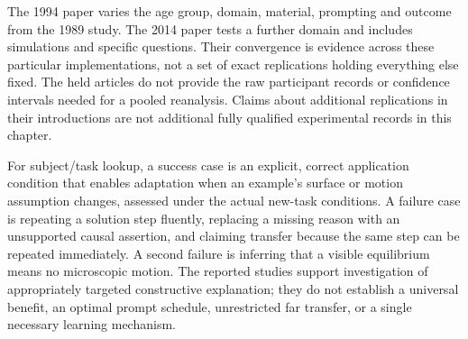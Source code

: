 The 1994 paper varies the age group, domain, material, prompting and outcome
from the 1989 study. The 2014 paper tests a further domain and includes
simulations and specific questions. Their convergence is evidence across
these particular implementations, not a set of exact replications holding
everything else fixed. The held articles do not provide the raw participant
records or confidence intervals needed for a pooled reanalysis. Claims
about additional replications in their introductions are not additional
fully qualified experimental records in this chapter.

For subject/task lookup, a success case is an explicit, correct application
condition that enables adaptation when an example's surface or motion
assumption changes, assessed under the actual new-task conditions. A failure
case is repeating a solution step fluently, replacing a missing reason with
an unsupported causal assertion, and claiming transfer because the same
step can be repeated immediately. A second failure is inferring that a
visible equilibrium means no microscopic motion. The reported studies
support investigation of appropriately targeted constructive explanation;
they do not establish a universal benefit, an optimal prompt schedule,
unrestricted far transfer, or a single necessary learning mechanism.


